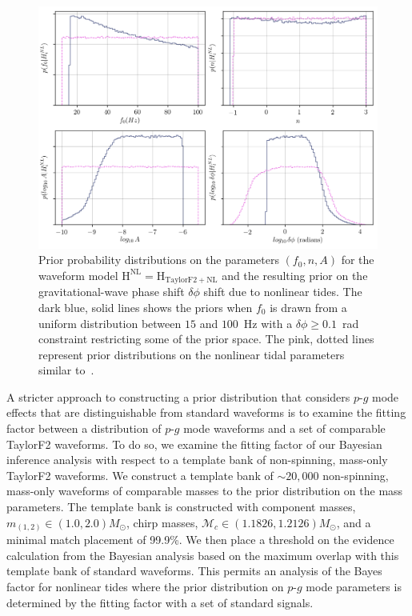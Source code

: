 \begin{figure}[th]
\centering
\includegraphics[width=0.9\columnwidth]{figs/chapter6/all_pg_priors}
\caption{Prior probability distributions on the parameters $(f_0, n, A)$ for the waveform model $\mathrm{H}^{\mathrm{NL}} = \mathrm{H}_\mathrm{TaylorF2+NL}$ and the resulting prior on the gravitational-wave phase shift $\delta\phi$ shift due to nonlinear tides. The dark blue, solid lines shows the priors when $f_0$ is drawn from a uniform distribution between $15$ and $100$~Hz with a $\delta\phi \ge 0.1$~rad constraint restricting some of the prior space. The pink, dotted lines represent prior distributions on the nonlinear tidal parameters similar to~\cite{abbott2019constraining}.}
\label{fig:priors}
\end{figure}

A stricter approach to constructing a prior distribution that considers $p$-$g$ mode effects that are distinguishable from standard waveforms is to examine the fitting factor between a distribution of $p$-$g$ mode waveforms and a set of comparable TaylorF2 waveforms. To do so, we examine the fitting factor of our Bayesian inference analysis with respect to a template bank of non-spinning, mass-only TaylorF2 waveforms. We construct a template bank of $\sim 20,000$ non-spinning, mass-only waveforms of comparable masses to the prior distribution on the mass parameters. The template bank is constructed with component masses, $m_{(1,2)} \in (1.0, 2.0) M_{\odot}$, chirp masses, $\mathcal{M}_c \in (1.1826, 1.2126) M_{\odot}$, and a minimal match placement of 99.9\%. We then place a threshold on the evidence calculation from the Bayesian analysis based on the maximum overlap with this template bank of standard waveforms. This permits an analysis of the Bayes factor for nonlinear tides where the prior distribution on $p$-$g$ mode parameters is determined by the fitting factor with a set of standard signals.

